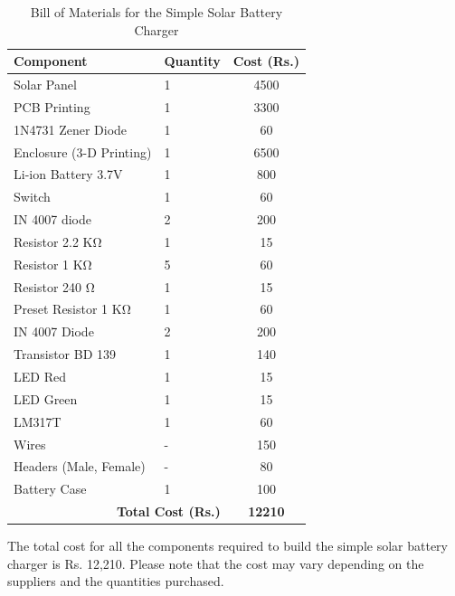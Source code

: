 \documentclass[twocolumn]{article}
\begin{document}
\begin{table}[h]
    \centering
    \caption{Component Values and Quantities}
    \begin{tabular}{|l|l|c|}
        \hline
        \textbf{Component} & \textbf{Quantity} & \textbf{Cost (Rs.)} \\
        \hline
        Solar Panel & 1 & 4500 \\
        \hline
        PCB Printing & 1 & 3300 \\
        \hline
        1N4731 Zener Diode & 1 & 60 \\
        \hline
        Enclosure (3-D Printing) & 1 & 6500 \\
        \hline
        Li-ion Battery 3.7V & 1 & 800 \\
        \hline
        Switch & 1 & 60 \\
        \hline
        IN 4007 diode & 2 & 200 \\
        \hline
        Resistor 2.2 KΩ & 1 & 15 \\
        \hline
        Resistor 1 KΩ & 5 & 60 \\
        \hline
        Resistor 240 Ω & 1 & 15 \\
        \hline
        Preset Resistor 1 KΩ & 1 & 60 \\
        \hline
        IN 4007 Diode & 2 & 200 \\
        \hline
        Transistor BD 139 & 1 & 140 \\
        \hline
        LED Red & 1 & 15 \\
        \hline
        LED Green & 1 & 15 \\
        \hline
        LM317T & 1 & 60 \\
        \hline
        Wires & - & 150 \\
        \hline
        Headers (Male, Female) & - & 80 \\
        \hline
        Battery Case & 1 & 100 \\
        \hline
        \multicolumn{2}{|r|}{\textbf{Total Cost (Rs.)}} & \textbf{12210} \\
        \hline
    \end{tabular}
    \caption{Bill of Materials for the Simple Solar Battery Charger}
    \label{tab:bom}
\end{table}


\noindent The total cost for all the components required to build the simple solar battery charger is Rs. 12,210. Please note that the cost may vary depending on the suppliers and the quantities purchased.
\end{document}
